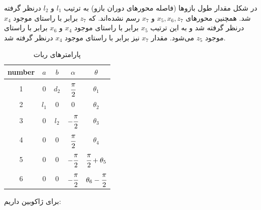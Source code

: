 \documentclass[12pt]{article}
\begin{document}
        	در شکل مقدار طول بازوها (فاصله محورهای دوران بازو) به ترتیب 
        	$l_1$ 
        	و 
        	$l_2$
        	درنظر گرفته شد. همچنین محورهای 
        	$x_5, x_6, z_7$
        	و 
        	$x_7$
        	رسم نشده‌اند. که
        	$z_7$
        	برابر با راستای موجود $x_4$ درنظر گرفته شد و به این ترتیب 
        	$x_5$
        	برابر با راستای موجود
        	$x_4$
        	و 
        	$x_6$
        	برابر با راستای موجود 
        	$z_5$
        	می‌شود. مقدار $x_7$ نیز برابر با راستای موجود $x_4$ درنظر گرفته شد.
        	        \begin{table}[ht]
        		\centering
	\caption{پارامترهای  ربات }
	\label{tab:q2-dh}
	\begin{latin}
		\begin{tabular}{c | ccc c}
			number & $a$ & $b$ & $\alpha$ & $\theta$ \\
			\hline
			1 & 0 & $d_2$ & $\cfrac{\pi}{2}$  & $\theta_1$ \\
			2 & $l_1$ &  0 &  0 & $\theta_2$ \\
			3 & 0  & $l_2$ &  $-\cfrac{\pi}{2}$ &  $\theta_3$ \\
			4 & 0 & 0  & $\cfrac{\pi}{2}$ & $\theta_4$ \\
			5 & 0 & 0 & $-\cfrac{\pi}{2}$ & $\cfrac{\pi}{2} + \theta_5$ \\
			6 & 0 & 0 & $-\cfrac{\pi}{2} $ & $\theta_6 - \cfrac{\pi}{2} $ \\
		\end{tabular}
	\end{latin}
\end{table}
برای ژاکوبین داریم:
\end{document}
